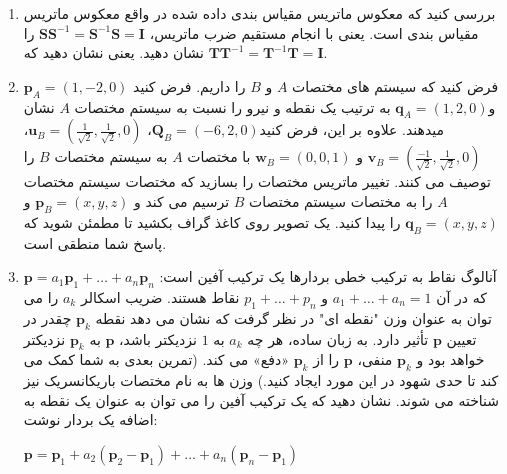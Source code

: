 {\begin{spacing}{1.5}
\begin{enumerate}[label=\textbf{\arabic*}.]
            \item {بررسی کنید که معکوس ماتریس مقیاس بندی داده شده در واقع معکوس ماتریس مقیاس بندی است.
            یعنی با انجام مستقیم ضرب ماتریس، $\textbf{SS}^{-1}=\textbf{S}^{-1}\textbf{S}=\textbf{I}$ را نشان دهید. یعنی نشان دهید که $\textbf{TT}^{-1}=\textbf{T}^{-1}\textbf{T}=\textbf{I}$.}

            \item {فرض کنید که سیستم های مختصات $A$ و $B$ را داریم.
            فرض کنید $\textbf{p}_{A}=(1,-2,0)$ و$\textbf{q}_{A}=(1,2,0)$ به ترتیب یک نقطه و نیرو را نسبت به سیستم مختصات $A$ نشان میدهند.
            علاوه بر این، فرض کنید$\textbf{Q}_{B}=(-6,2,0)$، $\textbf{u}_{B}=\left(\frac{\displaystyle 1}{\sqrt{\displaystyle 2}},\frac{\displaystyle 1}{\sqrt{\displaystyle 2}},0 \right)$، $\textbf{v}_{B}=\left(\frac{\displaystyle -1}{\sqrt{\displaystyle 2}},\frac{\displaystyle 1}{\sqrt{\displaystyle 2}},0 \right)$ و $\textbf{w}_{B}=(0,0,1)$ با مختصات $A$ به سیستم مختصات $B$ را توصیف می کنند.
            تغییر ماتریس مختصات را بسازید که مختصات سیستم مختصات $A$ را به مختصات سیستم مختصات $B$ ترسیم می کند و $\textbf{p}_{B}=(x,y,z)$ و $\textbf{q}_{B}=(x,y,z)$ را پیدا کنید.
            یک تصویر روی کاغذ گراف بکشید تا مطمئن شوید که پاسخ شما منطقی است.}

            \item {
                آنالوگ نقاط به ترکیب خطی بردارها یک ترکیب آفین است:
                $\textbf{p}=a_{1}\textbf{p}_{1}+\dots+a_{n}\textbf{p}_{n}$ که در آن $a_{1}+\dots+a_{n}=1$ و $p_{1}+\dots+p_{n}$ نقاط هستند.
                ضریب اسکالر $a_{k}$ را می توان به عنوان وزن "نقطه ای" در نظر گرفت
                که نشان می دهد نقطه $\textbf{p}_{k}$ چقدر در تعیین $\textbf{p}$ تأثیر دارد.
                به زبان ساده، هر چه $a_{k}$ به $1$ نزدیکتر باشد،
                $\textbf{p}$ به $\textbf{p}_{k}$ نزدیکتر خواهد بود و $\textbf{p}_{k}$ منفی، $\textbf{p}$ را از $\textbf{p}_{k}$ «دفع» می کند.
                (تمرین بعدی به شما کمک می کند تا حدی شهود در این مورد ایجاد کنید.) وزن ها به نام مختصات باریکانسریک نیز شناخته می شوند.
                نشان دهید که یک ترکیب آفین را می توان به عنوان یک نقطه به اضافه یک بردار نوشت:
                \begin{center}
                    $\textbf{p}=\textbf{p}_{1}+a_{2}(\textbf{p}_{2}-\textbf{p}_{1})+\dots+a_{n}(\textbf{p}_{n}-\textbf{p}_{1})$
                \end{center}
            }


\end{enumerate}
\end{spacing}}
